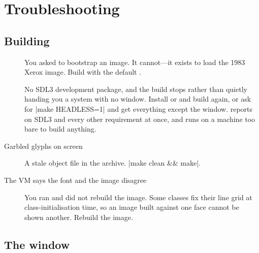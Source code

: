 \chapter{Troubleshooting}
\label{app:trouble}

\section{Building}

\begin{description}
\item[] You asked
   to bootstrap an image. It cannot---it exists to load the 1983
  Xerox image. Build with the default .
\item[] No SDL3 development package, and the build
  stops rather than quietly handing you a system with no window. Install
   or  and build again, or ask for
  \ct|make HEADLESS=1| and get everything except the window. 
  reports on SDL3 and every other requirement at once, and runs on a machine
  too bare to build anything.
\item[Garbled glyphs on screen] A stale object file in the archive.
  \ct|make clean && make|.
\item[The VM says the font and the image disagree] You ran  and
  did not rebuild the image. Some classes fix their line grid at
  class-initialisation time, so an image built against one face cannot be shown
  another. Rebuild the image.
\end{description}

\section{The window}

